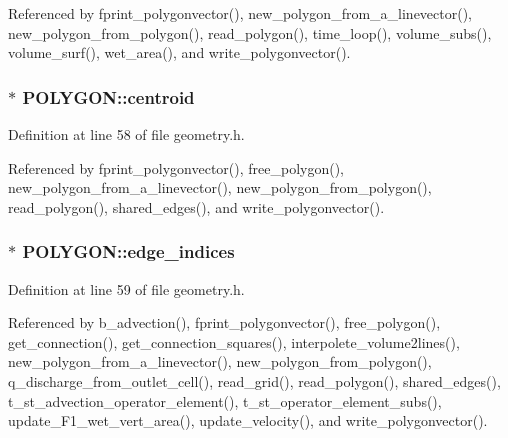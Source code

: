 Referenced by fprint\-\_\-polygonvector(), new\-\_\-polygon\-\_\-from\-\_\-a\-\_\-linevector(), new\-\_\-polygon\-\_\-from\-\_\-polygon(), read\-\_\-polygon(), time\-\_\-loop(), volume\-\_\-subs(), volume\-\_\-surf(), wet\-\_\-area(), and write\-\_\-polygonvector().

\hypertarget{struct_p_o_l_y_g_o_n_a5a3b288be4c6fad14c818136e35c1411}{
\subsubsection[{centroid}]{$\ast$ P\-O\-L\-Y\-G\-O\-N\-::centroid}}\label{struct_p_o_l_y_g_o_n_a5a3b288be4c6fad14c818136e35c1411}


Definition at line 58 of file geometry.\-h.



Referenced by fprint\-\_\-polygonvector(), free\-\_\-polygon(), new\-\_\-polygon\-\_\-from\-\_\-a\-\_\-linevector(), new\-\_\-polygon\-\_\-from\-\_\-polygon(), read\-\_\-polygon(), shared\-\_\-edges(), and write\-\_\-polygonvector().

\hypertarget{struct_p_o_l_y_g_o_n_a6bf24b7f06695c476fd1169b70e3ef25}{
\subsubsection[{edge\-\_\-indices}]{$\ast$ P\-O\-L\-Y\-G\-O\-N\-::edge\-\_\-indices}}\label{struct_p_o_l_y_g_o_n_a6bf24b7f06695c476fd1169b70e3ef25}


Definition at line 59 of file geometry.\-h.



Referenced by b\-\_\-advection(), fprint\-\_\-polygonvector(), free\-\_\-polygon(), get\-\_\-connection(), get\-\_\-connection\-\_\-squares(), interpolete\-\_\-volume2lines(), new\-\_\-polygon\-\_\-from\-\_\-a\-\_\-linevector(), new\-\_\-polygon\-\_\-from\-\_\-polygon(), q\-\_\-discharge\-\_\-from\-\_\-outlet\-\_\-cell(), read\-\_\-grid(), read\-\_\-polygon(), shared\-\_\-edges(), t\-\_\-st\-\_\-advection\-\_\-operator\-\_\-element(), t\-\_\-st\-\_\-operator\-\_\-element\-\_\-subs(), update\-\_\-\-F1\-\_\-wet\-\_\-vert\-\_\-area(), update\-\_\-velocity(), and write\-\_\-polygonvector().


